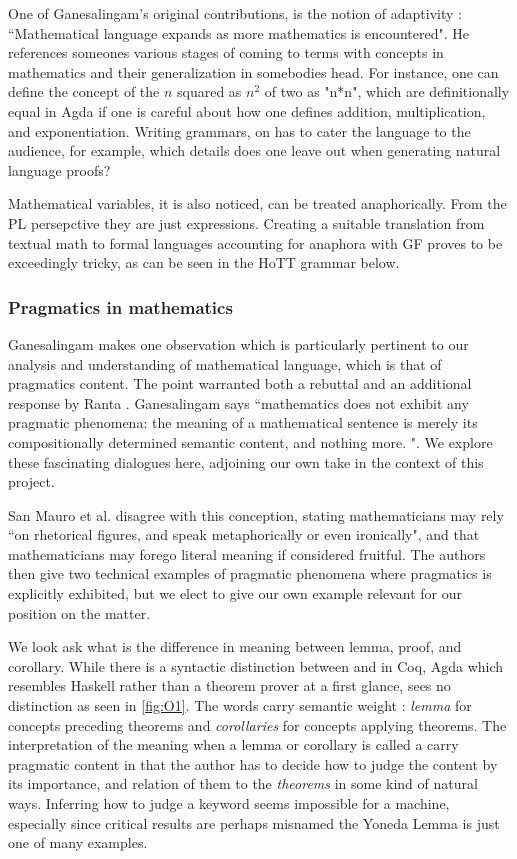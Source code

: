One of Ganesalingam's original contributions, is the notion of adaptivity :
``Mathematical language expands as more mathematics is encountered". He
references someones various stages of coming to terms with concepts in
mathematics and their generalization in somebodies head. For instance, one can
define the concept of the $n$ squared as $n^2$ of two as "n*n", which are
definitionally equal in Agda if one is careful about how one defines addition,
multiplication, and exponentiation. Writing grammars, on has to cater the
language to the audience, for example, which details does one leave out when
generating natural language proofs?

Mathematical variables, it is also noticed, can be treated anaphorically. From
the PL persepctive they are just expressions. Creating a suitable translation
from textual math to formal languages accounting for anaphora with GF proves to
be exceedingly tricky, as can be seen in the HoTT grammar below.

\subsubsection{Pragmatics in mathematics}

Ganesalingam makes one observation which is particularly pertinent to our
analysis and understanding of mathematical language, which is that of pragmatics
content. The point warranted both a rebuttal \cite{RUFFINO2020114} and an
additional response by Ranta \cite{RANTA2020120}. Ganesalingam says
``mathematics does not exhibit any pragmatic phenomena: the meaning of a
mathematical sentence is merely its compositionally determined semantic content,
and nothing more. ". We explore these fascinating dialogues here, adjoining our
own take in the context of this project.

San Mauro et al. disagree with this conception, stating mathematicians may rely
``on rhetorical figures, and speak metaphorically or even ironically", and that
mathematicians may forego literal meaning if considered fruitful. The authors
then give two technical examples of pragmatic phenomena where pragmatics is
explicitly exhibited, but we elect to give our own example relevant for our position on
the matter.

We look ask what is the difference in meaning between lemma, proof, and
corollary. While there is a syntactic distinction between  and
 in Coq, Agda which resembles Haskell rather than a theorem prover
at a first glance, sees no distinction as seen in \autoref{fig:O1}. The words carry semantic weight :
\emph{lemma} for concepts preceding theorems and \emph{corollaries} for concepts
applying theorems. The interpretation of the meaning when a lemma or corollary
is called a carry pragmatic content in that the author has to decide how to
judge the content by its importance, and relation of them to the \emph{theorems}
in some kind of natural ways. Inferring how to judge a keyword seems impossible
for a machine, especially since critical results are perhaps misnamed the Yoneda
Lemma is just one of many examples.

